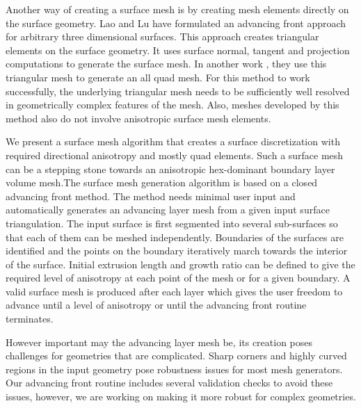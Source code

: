 \documentclass[conf]{new-aiaa}
\begin{document}
Another way of creating a surface mesh is by creating mesh elements directly on the surface geometry. Lao and Lu\cite{ lan1996finite} have formulated an advancing front approach for arbitrary three dimensional surfaces. This approach creates triangular elements on the surface geometry. It uses surface normal, tangent and projection computations to generate the surface mesh. In another work \cite{lau1997generation}, they use this triangular mesh to generate an all quad mesh. For this method to work successfully, the underlying triangular mesh needs to be sufficiently well resolved in geometrically complex features of the mesh. Also, meshes developed by this method also do not involve anisotropic surface mesh elements.


We present a surface mesh algorithm that creates a surface discretization with required directional anisotropy and mostly quad elements. Such a surface mesh can be a stepping stone towards an anisotropic hex-dominant boundary layer volume mesh.The surface mesh generation algorithm is based on a closed advancing front method. The method needs minimal user input and automatically generates an advancing layer mesh from a given input surface triangulation. The input surface is first segmented into several sub-surfaces so that each of them can be meshed independently. Boundaries of the surfaces are identified and the points on the boundary iteratively march towards the interior of the surface. Initial extrusion length and growth ratio can be defined to give the required level of anisotropy at each point of the mesh or for a given boundary. A valid surface mesh is produced after each layer which gives the user freedom to advance until a level of anisotropy or until the advancing front routine terminates.

However important may the advancing layer mesh be, its creation poses challenges for geometries that are complicated. Sharp corners and highly curved regions in the input geometry pose robustness issues for most mesh generators. Our advancing front routine includes several validation checks to avoid these issues, however, we are working on making it more robust for complex geometries.
\end{document}
